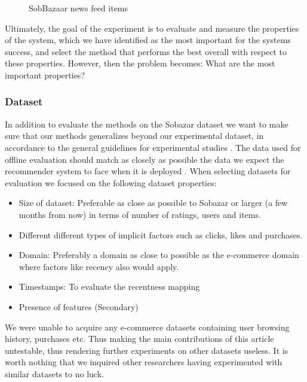 \begin{figure}[H]
\begin{minipage}{.45\linewidth}
		\end{minipage}
		\caption[Sobazaar News Feed - Version 0.5.1]{SobBazaar news feed items}
		\label{figure:sobazarfeed}
\end{figure}

Ultimately, the goal of the experiment is to evaluate and measure the properties
of the system, which we have identified as the most important for the systems success,
and select the method that performs the best overall with respect to these properties.
However, then the problem becomes: What are the most important properties? 


\subsubsection{Dataset}

In addition to evaluate the methods on the Sobazar dataset we want to make sure that our
methods generalizes beyond our experimental dataset, in accordance to the general guidelines
for experimental studies \cite{Shani2011}. The data used for offline evaluation should match
as closely as possible the data we expect the recommender system to face when it is
deployed \cite{Gunawardana2009}. When selecting datasets for evaluation we focused on the
following dataset properties:

\begin{itemize}
	\item Size of dataset: Preferable as close as possible to Sobazar or larger (a few months from now)
	in terms of number of ratings, users and items.
	\item Different different types of implicit factors	such as clicks, likes and purchases.
	\item Domain: Preferably a domain as close to possible as the e-commerce domain where
	factors like recency also would apply.
	\item Timestamps: To evaluate the recentness mapping
	\item Presence of features (Secondary)
\end{itemize}

We were unable to acquire any e-commerce datasets containing user browsing history, purchases etc.
Thus making the main contributions of this article untestable, thus rendering further experiments
on other datasets useless. It is worth nothing that we inquired other researchers having
experimented with similar datasets to no luck.

